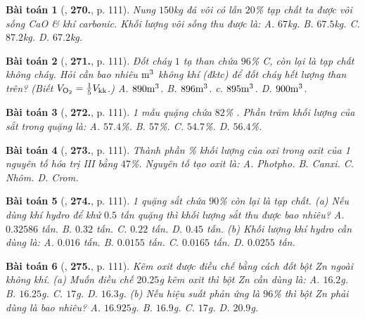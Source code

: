 \documentclass{article}
\numberwithin{equation}{section}
\newtheorem{baitoan}{Bài toán}
\begin{document}
\begin{baitoan}[\cite{An_400_BT_Hoa_Hoc_8_2020}, \textbf{270.}, p. 111]
	Nung $150$\emph{kg} đá vôi có lẫn $20$\% tạp chất ta được vôi sống \emph{CaO} \& khí carbonic. Khối lượng vôi sống thu được là: {\sf A.} $67$\emph{kg}. {\sf B.} $67.5$\emph{kg}. {\sf C.} $87.2$\emph{kg}. {\sf D.} $67.2$\emph{kg}.
\end{baitoan}

\begin{baitoan}[\cite{An_400_BT_Hoa_Hoc_8_2020}, \textbf{271.}, p. 111]
	Đốt cháy $1$ tạ than chứa $96$\% \emph{C}, còn lại là tạp chất không cháy. Hỏi cần bao nhiêu $\rm m^3$ không khí (đktc) để đốt cháy hết lượng than trên? (Biết $V_{\rm O_2} = \frac{1}{5}V_{\rm kk}$.) {\sf A.} $890\rm m^3$. {\sf B.} $896\rm m^3$. {\sf c.} $895\rm m^3$. {\sf D.} $900\rm m^3$. 
\end{baitoan}

\begin{baitoan}[\cite{An_400_BT_Hoa_Hoc_8_2020}, \textbf{272.}, p. 111]
	1 mẫu quặng chứa $82$\% \emph{}. Phần trăm khối lượng của sắt trong quặng là: {\sf A.} $57.4$\%. {\sf B.} $57$\%. {\sf C.} $54.7$\%. {\sf D.} $56.4$\%.
\end{baitoan}

\begin{baitoan}[\cite{An_400_BT_Hoa_Hoc_8_2020}, \textbf{273.}, p. 111]
	Thành phần \% khối lượng của oxi trong oxit của 1 nguyên tố hóa trị III bằng $47$\%. Nguyên tố tạo oxit là: {\sf A.} Photpho. {\sf B.} Canxi. {\sf C.} Nhôm. {\sf D.} Crom.
\end{baitoan}

\begin{baitoan}[\cite{An_400_BT_Hoa_Hoc_8_2020}, \textbf{274.}, p. 111]
	1 quặng sắt chứa $90$\% \emph{} còn lại là tạp chất. (a) Nếu dùng khí hydro để khử $0.5$ tấn quặng thì khối lượng sắt thu được bao nhiêu? {\sf A.} $0.32586$ tấn. {\sf B.} $0.32$ tấn. {\sf C.} $0.22$ tấn. {\sf D.} $0.45$ tấn. (b) Khối lượng khí hydro cần dùng là:  {\sf A.} $0.016$ tấn. {\sf B.} $0.0155$ tấn. {\sf C.} $0.0165$ tấn. {\sf D.} $0.0255$ tấn.
\end{baitoan}

\begin{baitoan}[\cite{An_400_BT_Hoa_Hoc_8_2020}, \textbf{275.}, p. 111]
	Kẽm oxit được điều chế bằng cách đốt bột \emph{Zn} ngoài không khí. (a) Muốn điều chế $20.25$\emph{g} kẽm oxit thì bột \emph{Zn} cần dùng là: {\sf A.} $16.2$\emph{g}. {\sf B.} $16.25$\emph{g}. {\sf C.} $17$\emph{g}. {\sf D.} $16.3$\emph{g}. (b) Nếu hiệu suất phản ứng là $96$\% thì bột \emph{Zn} phải dùng là bao nhiêu? {\sf A.} $16.925$\emph{g}. {\sf B.} $16.9$\emph{g}. {\sf C.} $17$\emph{g}. {\sf D.} $20.9$\emph{g}.
\end{baitoan}
\end{document}
